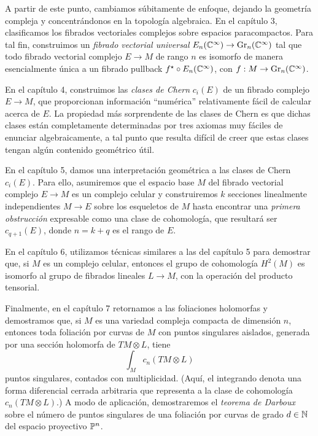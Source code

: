 A partir de este punto, cambiamos súbitamente de enfoque, dejando la geometría compleja y concentrándonos en la topología algebraica. En el capítulo 3, clasificamos los fibrados vectoriales complejos sobre espacios paracompactos. Para tal fin, construimos un \textit{fibrado vectorial universal} $E_n(\C^\infty) \to \Gr_n(\C^\infty)$ tal que todo fibrado vectorial complejo $E \to M$ de rango $n$ es isomorfo de manera esencialmente única a un fibrado pullback $f^\star \circ E_n(\C^\infty)$, con $f : M \to \Gr_n(\C^\infty)$.

En el capítulo 4, construimos las \textit{clases de Chern} $c_i(E)$ de un fibrado complejo $E \to M$, que proporcionan información ``numérica'' relativamente fácil de calcular acerca de $E$. La propiedad más sorprendente de las clases de Chern es que dichas clases están completamente determinadas por tres axiomas muy fáciles de enunciar algebraicamente, a tal punto que resulta difícil de creer que estas clases tengan algún contenido geométrico útil.

En el capítulo 5, damos una interpretación geométrica a las clases de Chern $c_i(E)$. Para ello, asumiremos que el espacio base $M$ del fibrado vectorial complejo $E \to M$ es un complejo celular y construiremos $k$ secciones linealmente independientes $M \to E$ sobre los esqueletos de $M$ hasta encontrar una \textit{primera obstrucción} expresable como una clase de cohomología, que resultará ser $c_{q+1}(E)$, donde $n = k+q$ es el rango de $E$.

En el capítulo 6, utilizamos técnicas similares a las del capítulo 5 para demostrar que, si $M$ es un complejo celular, entonces el grupo de cohomología $H^2(M)$ es isomorfo al grupo de fibrados lineales $L \to M$, con la operación del producto tensorial.

Finalmente, en el capítulo 7 retornamos a las foliaciones holomorfas y demostramos que, si $M$ es una variedad compleja compacta de dimensión $n$, entonces toda foliación por curvas de $M$ con puntos singulares aislados, generada por una sección holomorfa de $TM \otimes L$, tiene
$$\int_M c_n(TM \otimes L)$$
puntos singulares, contados con multiplicidad. (Aquí, el integrando denota una forma diferencial cerrada arbitraria que representa a la clase de cohomología $c_n(TM \otimes L)$.) A modo de aplicación, demostraremos el \textit{teorema de Darboux} sobre el número de puntos singulares de una foliación por curvas de grado $d \in \N$ del espacio proyectivo $\P^n$.
